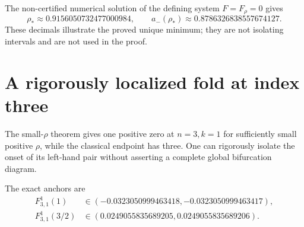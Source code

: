 \documentclass[11pt]{article}
\numberwithin{equation}{section}
\theoremstyle{definition}\newtheorem{definition}[theorem]{Definition}
\theoremstyle{remark}\newtheorem{remark}[theorem]{Remark}
\begin{document}
The non-certified numerical solution of the defining system $F=F_\rho=0$ gives
\begin{equation}\label{eq:n2numeric}
\rho_*\approx0.9156050732477000984,
\qquad a_-(\rho_*)\approx0.8786326838557674127.
\end{equation}
These decimals illustrate the proved unique minimum; they are not isolating intervals and are not used in the proof.

\section{A rigorously localized fold at index three}\label{sec:n3}
The small-$\rho$ theorem gives one positive zero at $n=3,k=1$ for sufficiently small positive $\rho$, while the classical endpoint has three. One can rigorously isolate the onset of its left-hand pair without asserting a complete global bifurcation diagram.

The exact anchors are
\begin{equation}\label{eq:n3anchors}
\begin{aligned}
F_{3,1}^{1}(1)&\in(-0.0323050999463418,-0.0323050999463417),\\
F_{3,1}^{1}(3/2)&\in(0.0249055835689205,0.0249055835689206).
\end{aligned}
\end{equation}
\end{document}
